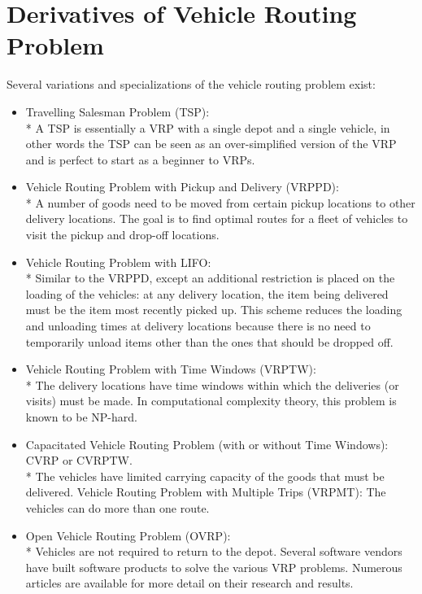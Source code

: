 \documentclass[11pt,fleqn]{book} %
\begin{document}
\section{Derivatives of Vehicle Routing Problem}
Several variations and specializations of the vehicle routing problem exist:
\begin{itemize}
\item Travelling Salesman Problem (TSP):\\*
A TSP is essentially a VRP with a single depot and a single vehicle, in other words the TSP can be seen as an over-simplified version of the VRP and is perfect to start as a beginner to VRPs.

\item Vehicle Routing Problem with Pickup and Delivery (VRPPD):\\*
A number of goods need to be moved from certain pickup locations to other delivery locations. The goal is to find optimal routes for a fleet of vehicles to visit the pickup and drop-off locations.

\item Vehicle Routing Problem with LIFO: \\* 
Similar to the VRPPD, except an additional restriction is placed on the loading of the vehicles: at any delivery location, the item being delivered must be the item most recently picked up. This scheme reduces the loading and unloading times at delivery locations because there is no need to temporarily unload items other than the ones that should be dropped off.

\item Vehicle Routing Problem with Time Windows (VRPTW):\\* 
The delivery locations have time windows within which the deliveries (or visits) must be made. In computational complexity theory, this problem is known to be NP-hard.

\item Capacitated Vehicle Routing Problem (with or without Time Windows): CVRP or CVRPTW.\\*
The vehicles have limited carrying capacity of the goods that must be delivered.
Vehicle Routing Problem with Multiple Trips (VRPMT): The vehicles can do more than one route.

\item Open Vehicle Routing Problem (OVRP):\\*
Vehicles are not required to return to the depot.
Several software vendors have built software products to solve the various VRP problems. Numerous articles are available for more detail on their research and results.

\end{itemize}
\end{document}
